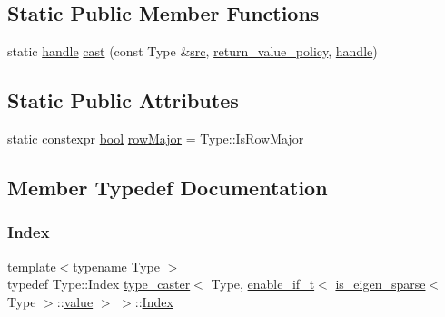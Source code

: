 \subsection*{Static Public Member Functions}
\begin{DoxyCompactItemize}
\item 
static \mbox{\hyperlink{classhandle}{handle}} \mbox{\hyperlink{structtype__caster_3_01_type_00_01enable__if__t_3_01is__eigen__sparse_3_01_type_01_4_1_1value_01_4_01_4_a1a15393d11a1bba5521da71a0be20a45}{cast}} (const Type \&\mbox{\hyperlink{_s_d_l__opengl__glext_8h_a72e0fdf0f845ded60b1fada9e9195cd7}{src}}, \mbox{\hyperlink{detail_2common_8h_adde72ab1fb0dd4b48a5232c349a53841}{return\+\_\+value\+\_\+policy}}, \mbox{\hyperlink{classhandle}{handle}})
\end{DoxyCompactItemize}
\subsection*{Static Public Attributes}
\begin{DoxyCompactItemize}
\item 
static constexpr \mbox{\hyperlink{asdl_8h_af6a258d8f3ee5206d682d799316314b1}{bool}} \mbox{\hyperlink{structtype__caster_3_01_type_00_01enable__if__t_3_01is__eigen__sparse_3_01_type_01_4_1_1value_01_4_01_4_a996a5fc0021f2e323928643ae036382e}{row\+Major}} = Type\+::\+Is\+Row\+Major
\end{DoxyCompactItemize}


\subsection{Member Typedef Documentation}
\mbox{\label{structtype__caster_3_01_type_00_01enable__if__t_3_01is__eigen__sparse_3_01_type_01_4_1_1value_01_4_01_4_a9ce3b790dd5bdeb5578419053e450feb}} 
\subsubsection{\texorpdfstring{Index}{Index}}
{\footnotesize\ttfamily template$<$typename Type $>$ \\
typedef Type\+::\+Index \mbox{\hyperlink{classtype__caster}{type\+\_\+caster}}$<$ Type, \mbox{\hyperlink{detail_2common_8h_a012819c9e8b5e04872a271f50f8b8196}{enable\+\_\+if\+\_\+t}}$<$ \mbox{\hyperlink{eigen_8h_af680e1af5697a93b0f4fc037a2100fbc}{is\+\_\+eigen\+\_\+sparse}}$<$ Type $>$\+::\mbox{\hyperlink{_s_d_l__opengl__glext_8h_a8ad81492d410ff2ac11f754f4042150f}{value}} $>$ $>$\+::\mbox{\hyperlink{structtype__caster_3_01_type_00_01enable__if__t_3_01is__eigen__sparse_3_01_type_01_4_1_1value_01_4_01_4_a9ce3b790dd5bdeb5578419053e450feb}{Index}}}

